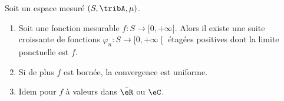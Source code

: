 \begin{theorem}\label{THOooXHIVooKUddLi}
	Soit un espace mesuré \( (S,\tribA,\mu)\).
	\begin{enumerate}
		\item
		      Soit une fonction mesurable \( f\colon S\to \mathopen[ 0 , +\infty \mathclose]\). Alors il existe une suite croissante de fonctions \( \varphi_n\colon S\to \mathopen[ 0 , +\infty \mathclose[\) étagées positives dont la limite ponctuelle est \( f\).
		\item
		      Si de plus \( f\) est bornée, la convergence est uniforme.
		\item
		      Idem pour \( f\) à valeurs dans \( \bar \eR\) ou \( \eC\).
	\end{enumerate}
\end{theorem}

